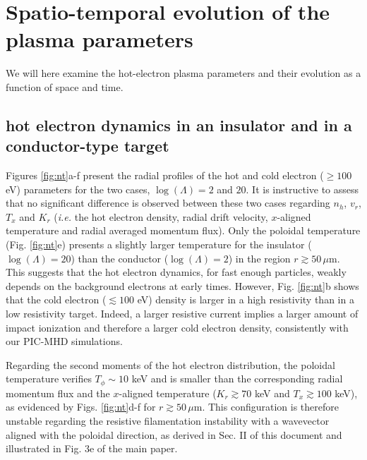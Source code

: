 \documentclass[aps,showpacs,superscriptaddress]{revtex4}
\begin{document}
\section{Spatio-temporal evolution of the plasma parameters}
We will here examine the hot-electron plasma parameters and their evolution as a function of space and time. 

\subsection{hot electron dynamics in an insulator and in a conductor-type target} 
Figures \ref{fig:nt}a-f present the radial profiles of the hot and cold electron ($\ge 100$ eV) parameters for the two cases, $\log(\Lambda)=2$ and $20$. 
It is instructive to assess that no significant difference is observed between these two cases regarding $n_h$, $v_r$, $T_x$ and $K_r$ (\emph{i.e.} the hot electron density, radial drift velocity, $x$-aligned temperature and radial averaged momentum flux). Only the poloidal temperature (Fig. \ref{fig:nt}e) presents a slightly larger temperature for the insulator ($\log(\Lambda)=20$)  than the conductor ($\log(\Lambda)=2$) in the region $r\gtrsim 50\, \mu$m. 
This suggests that the hot electron dynamics, for fast enough particles, weakly depends on the background electrons at early times.
However, Fig. \ref{fig:nt}b shows that the cold electron ($\lesssim 100$ eV) density is larger in a high resistivity than in a low resistivity target. Indeed, a larger resistive current implies a larger amount of impact ionization and therefore a larger cold electron density, consistently with our PIC-MHD simulations. 

Regarding the second moments of the hot electron distribution, 
the   poloidal  temperature verifies $T_\phi\sim 10$ keV and  is  smaller than the corresponding radial momentum flux and the $x$-aligned temperature ($K_r\gtrsim 70$ keV and $T_x\gtrsim 100$ keV),  as evidenced by Figs. \ref{fig:nt}d-f for $r\gtrsim 50\, \mu$m. This configuration is therefore unstable regarding the resistive filamentation instability with a wavevector aligned with the poloidal direction, as derived in Sec. II of this document and illustrated in Fig. 3e of the main paper.
\end{document}
